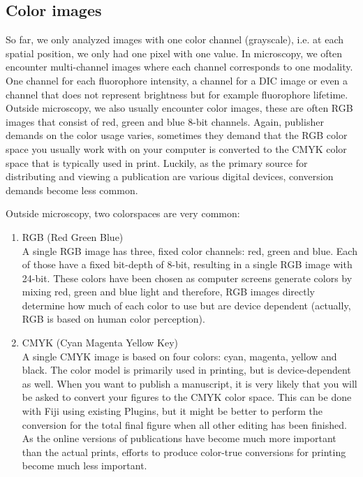 \subsection{Color images}

So far, we only analyzed images with one color channel (grayscale), i.e. at each spatial position, we only had one pixel with one value. In microscopy, we often encounter multi-channel images where each channel corresponds to one modality. One channel for each fluorophore intensity, a channel for a DIC image or even a channel that does not represent brightness but for example fluorophore lifetime. Outside microscopy, we also usually encounter color images, these are often RGB images that consist of red, green and blue 8-bit channels. Again, publisher demands on the color usage varies, sometimes they demand that the RGB color space you usually work with on your computer is converted to the CMYK color space that is typically used in print. Luckily, as the primary source for distributing and viewing a publication are various digital devices, conversion demands become less common. 

Outside microscopy, two colorspaces are very common:
\begin{enumerate}
	\item RGB (Red Green Blue)\\A single RGB image has three, fixed color channels: red, green and blue. Each of those have a fixed bit-depth of 8-bit, resulting in a single RGB image with 24-bit. These colors have been chosen as computer screens generate colors by mixing red, green and blue light and therefore, RGB images directly determine how much of each color to use but are device dependent (actually, RGB is based on human color perception).
	\item CMYK (Cyan Magenta Yellow Key)\\A single CMYK image is based on four colors: cyan, magenta, yellow and black. The color model is primarily used in printing, but is device-dependent as well. When you want to publish a manuscript, it is very likely that you will be asked to convert your figures to the CMYK color space. This can be done with Fiji using existing Plugins, but it might be better to perform the conversion for the total final figure when all other editing has been finished. As the online versions of publications have become much more important than the actual prints, efforts to produce color-true conversions for printing become much less important.
\end{enumerate}


